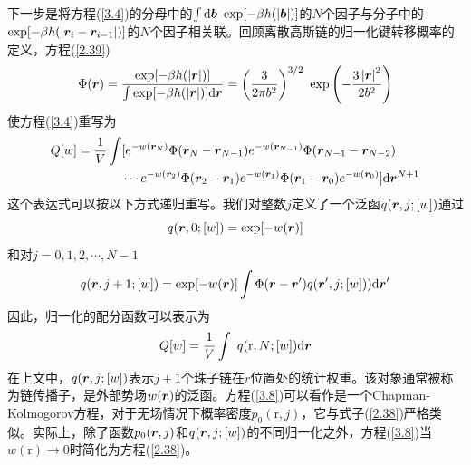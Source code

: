 下一步是将方程(\ref{3.4})的分母中的$\int\mathrm{d}\bm{b}~\exp[-\beta h(\left|\bm{b}\right|)]$的$N$个因子与分子中的$\exp[-\beta h(\left|\bm{r}_i-\bm{r}_{i-1}\right|)]$的$N$个因子相关联。回顾离散高斯链的归一化键转移概率的定义，方程(\ref{2.39})
\begin{equation}\label{3.5}
\Phi(\bm{r})=\frac{\exp[-\beta h(\left|\bm{r}\right|)]}{\int\exp[-\beta h(\left|\bm{r}\right|)]\mathrm{d}\bm{r}}=\left(\frac{3}{2\pi b^2}\right)^{3/2}~\exp\left(-\frac{3\left|\bm{r}\right|^2}{2b^2}\right)
\end{equation}
使方程(\ref{3.4})重写为
\begin{equation}\label{3.6}
\begin{aligned}
Q[w]=\frac{1}{V}\int&[e^{-w(\bm{r}_N)}\Phi(\bm{r}_N-\bm{r}_{N-1})e^{-w(\bm{r}_{N-1})}\Phi(\bm{r}_{N-1}-\bm{r}_{N-2})\\
&\cdots e^{-w(\bm{r}_2)}\Phi(\bm{r}_2-\bm{r}_1)e^{-w(\bm{r}_1)}\Phi(\bm{r}_1-\bm{r}_0)e^{-w(\bm{r}_0)}]\mathrm{d}\bm{r}^{N+1}
\end{aligned}
\end{equation}
这个表达式可以按以下方式递归重写。我们对整数$j$定义了一个泛函$q(\bm{r},j;[w])$通过
\begin{equation}\label{3.7}
q(\bm{r},0;[w])=\exp[-w(\bm{r})]
\end{equation}
和对$j=0,1,2,\cdots,N-1$
\begin{equation}\label{3.8}
q(\bm{r},j+1;[w])=\exp[-w(\bm{r})]\int\Phi(\bm{r}-\bm{r}')q(\bm{r}',j;[w]))\mathrm{d}\bm{r}'
\end{equation}
因此，归一化的配分函数可以表示为
\begin{equation}\label{3.9}
Q[w]=\frac{1}{V}\int~q(\mathrm{r},N;[w])\mathrm{d}\bm{r}
\end{equation}
在上文中，$q(\bm{r},j;[w])$表示$j+1$个珠子链在$r$位置处的统计权重。该对象通常被称为链传播子，是外部势场$w(\bm{r})$的泛函。方程(\ref{3.8})可以看作是一个Chapman-Kolmogorov方程，对于无场情况下概率密度$p_0(\mathrm{r},j)$，它与式子(\ref{2.38})严格类似。实际上，除了函数$p_0(\bm{r},j)$和$q(\bm{r},j;[w])$的不同归一化之外，方程(\ref{3.8})当$w(\mathrm{r})\rightarrow 0$时简化为方程(\ref{2.38})。

